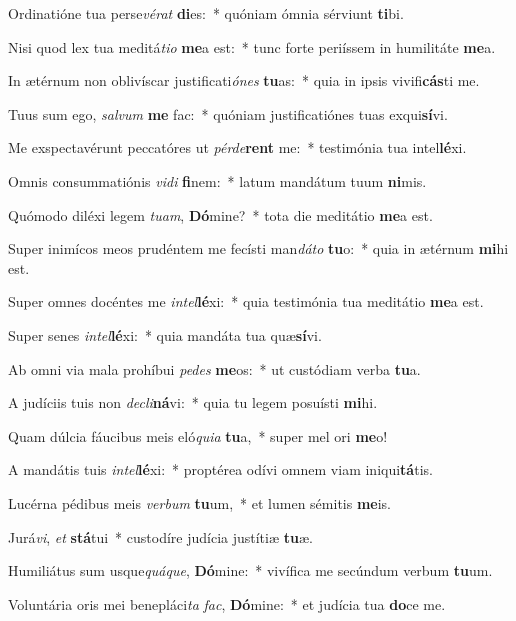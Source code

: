 \item Ordinatióne tua perse\textit{vé}\textit{rat} \textbf{di}es:~* quóniam ómnia sérviunt \textbf{ti}bi.
\item Nisi quod lex tua meditá\textit{ti}\textit{o} \textbf{me}a est:~* tunc forte periíssem in humilitáte \textbf{me}a.
\item In ætérnum non oblivíscar justificati\textit{ó}\textit{nes} \textbf{tu}as:~* quia in ipsis vivifi\textbf{cás}ti me.
\item Tuus sum ego, \textit{sal}\textit{vum} \textbf{me} fac:~* quóniam justificatiónes tuas exqui\textbf{sí}vi.
\item Me exspectavérunt peccatóres ut \textit{pér}\textit{de}\textbf{rent} me:~* testimónia tua intel\textbf{lé}xi.
\item Omnis consummatiónis \textit{vi}\textit{di} \textbf{fi}nem:~* latum mandátum tuum \textbf{ni}mis.
\item Quómodo diléxi legem \textit{tu}\textit{am}, \textbf{Dó}mine?~* tota die meditátio \textbf{me}a est.
\item Super inimícos meos prudéntem me fecísti man\textit{dá}\textit{to} \textbf{tu}o:~* quia in ætérnum \textbf{mi}hi est.
\item Super omnes docéntes me \textit{in}\textit{tel}\textbf{lé}xi:~* quia testimónia tua meditátio \textbf{me}a est.
\item Super senes \textit{in}\textit{tel}\textbf{lé}xi:~* quia mandáta tua quæ\textbf{sí}vi.
\item Ab omni via mala prohíbui \textit{pe}\textit{des} \textbf{me}os:~* ut custódiam verba \textbf{tu}a.
\item A judíciis tuis non \textit{de}\textit{cli}\textbf{ná}vi:~* quia tu legem posuísti \textbf{mi}hi.
\item Quam dúlcia fáucibus meis eló\textit{qui}\textit{a} \textbf{tu}a,~* super mel ori \textbf{me}o!
\item A mandátis tuis \textit{in}\textit{tel}\textbf{lé}xi:~* proptérea odívi omnem viam iniqui\textbf{tá}tis.
\item Lucérna pédibus meis \textit{ver}\textit{bum} \textbf{tu}um,~* et lumen sémitis \textbf{me}is.
\item Jurá\textit{vi}, \textit{et} \textbf{stá}tui~* custodíre judícia justítiæ \textbf{tu}æ.
\item Humiliátus sum usque\textit{quá}\textit{que}, \textbf{Dó}mine:~* vivífica me secúndum verbum \textbf{tu}um.
\item Voluntária oris mei benepláci\textit{ta} \textit{fac}, \textbf{Dó}mine:~* et judícia tua \textbf{do}ce me.
